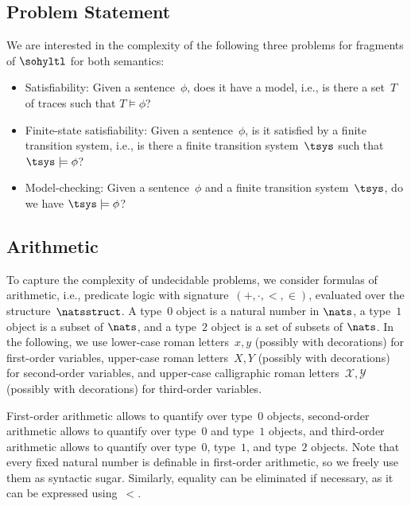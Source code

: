 \subsection{Problem Statement}

We are interested in the complexity of the following three problems for fragments of $\sohyltl$ for both semantics:
\begin{itemize}
    \item Satisfiability: Given a sentence~$\phi$, does it have a model, i.e., is there a set~$T$ of traces such that $T \models \phi$?
    \item Finite-state satisfiability: Given a sentence~$\phi$, is it satisfied by a finite transition system, i.e., is there a finite transition system~$\tsys$ such that $\tsys \models \phi$?
    \item Model-checking: Given a sentence~$\phi$ and a finite transition system~$\tsys$, do we have $\tsys \models \phi$?
\end{itemize}

\subsection{Arithmetic}
\label{subsec_arithmetic}


To capture the complexity of undecidable problems, we consider formulas of arithmetic, i.e., predicate logic with signature~$(+, \cdot, <, \in)$, evaluated over the structure~$\natsstruct$. 
A type~$0$ object is a natural number in $\nats$, a type~$1$ object is a subset of $\nats$, and a type~$2$ object is a set of subsets of $\nats$.
In the following, we use lower-case roman letters~$x,y$ (possibly with decorations) for first-order variables, upper-case roman letters~$X,Y$ (possibly with decorations) for second-order variables, and upper-case calligraphic roman letters~$\mathcal{X},\mathcal{Y}$ (possibly with decorations) for third-order variables. 

First-order arithmetic allows to quantify over type~$0$ objects, second-order arithmetic allows to quantify over type~$0$ and type~$1$ objects, and third-order arithmetic allows to quantify over type~$0$, type~$1$, and type~$2$ objects.
Note that every fixed natural number is definable in first-order arithmetic, so we freely use them as syntactic sugar. Similarly, equality can be eliminated if necessary, as it can be expressed using~$<$.

